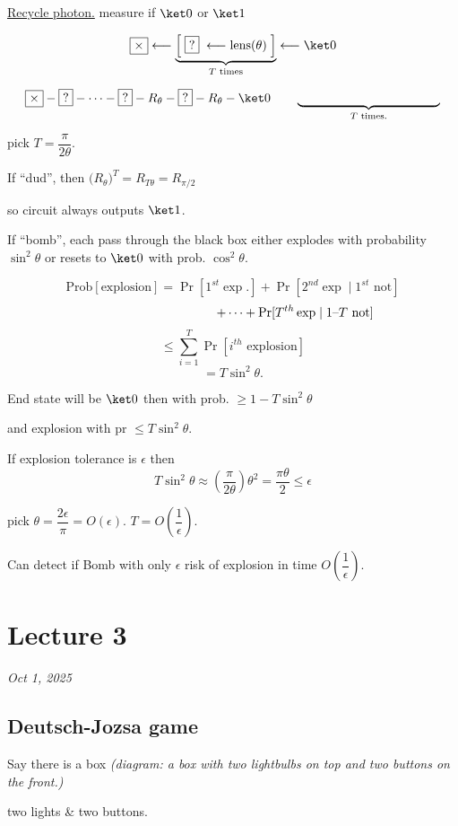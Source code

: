 \documentclass[11pt]{article}
\begin{document}
\underline{Recycle photon.} measure if $\ket0$ or $\ket1$

\[
\fbox{$\times$} \longleftarrow \underbrace{\Big[\;\fbox{?}\;\longleftarrow \text{lens}(\theta)\;\Big]}_{T \text{ times}} \longleftarrow \ket0
\]

\[
\fbox{$\times$} - \fbox{?} - \dots - \fbox{?} - R_\theta - \fbox{?} - R_\theta - \ket0 \qquad \underbrace{\hspace{4cm}}_{T \text{ times.}}
\]

pick $T = \dfrac{\pi}{2\theta}$.

If ``dud'', then $\big(R_\theta\big)^T = R_{T\theta} = R_{\pi/2}$

so circuit always outputs $\ket1$.

If ``bomb'', each pass through the black box either explodes with probability $\sin^2\theta$ or resets to $\ket0$ with prob. $\cos^2\theta$.

\[
\text{Prob}[\text{explosion}] = \Pr[1^{st}\exp.] + \Pr[2^{nd}\exp \mid 1^{st}\text{ not}]
\]
\[
\hspace{3.5cm} + \dots + \Pr[T^{th}\exp \mid 1\text{--}T \text{ not}]
\]
\[
\leq \sum_{i=1}^T \Pr[i^{th}\text{ explosion}]
\]
\[
= T\sin^2\theta.
\]

End state will be $\ket0$ then with prob. $\geq 1-T\sin^2\theta$

and explosion with pr $\leq T\sin^2\theta$.

If explosion tolerance is $\epsilon$ then
\[
T\sin^2\theta \approx \left(\frac{\pi}{2\theta}\right)\theta^2 = \frac{\pi\theta}{2} \leq \epsilon
\]

pick $\theta = \dfrac{2\epsilon}{\pi} = O(\epsilon)$. \qquad $T = O\left(\dfrac1\epsilon\right)$.

Can detect if Bomb with only $\epsilon$ risk of explosion in time $O\left(\dfrac1\epsilon\right)$.

\section{Lecture 3}
\textit{Oct 1, 2025}

\subsection*{Deutsch-Jozsa game}

Say there is a box \quad \emph{(diagram: a box with two lightbulbs on top and two buttons on the front.)}

two lights \& two buttons.
\end{document}
